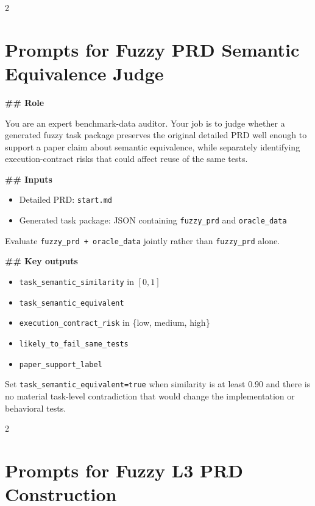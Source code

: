 \begin{multicols}{2}
\section{Prompts for Fuzzy PRD Semantic Equivalence Judge}
\label{appendix:fuzzy-prd-semantic}
\end{multicols}

\begin{promptbox}
\textbf{\#\# Role}

You are an expert benchmark-data auditor. Your job is to judge whether a generated fuzzy task package preserves the original detailed PRD well enough to support a paper claim about semantic equivalence, while separately identifying execution-contract risks that could affect reuse of the same tests.

\textbf{\#\# Inputs}
\begin{itemize}
\item Detailed PRD: \texttt{start.md}
\item Generated task package: JSON containing \texttt{fuzzy\_prd} and \texttt{oracle\_data}
\end{itemize}

Evaluate \texttt{fuzzy\_prd + oracle\_data} jointly rather than \texttt{fuzzy\_prd} alone.

\textbf{\#\# Key outputs}
\begin{itemize}
\item \texttt{task\_semantic\_similarity} in $[0,1]$
\item \texttt{task\_semantic\_equivalent}
\item \texttt{execution\_contract\_risk} in \{low, medium, high\}
\item \texttt{likely\_to\_fail\_same\_tests}
\item \texttt{paper\_support\_label}
\end{itemize}

Set \texttt{task\_semantic\_equivalent=true} when similarity is at least 0.90 and there is no material task-level contradiction that would change the implementation or behavioral tests.
\end{promptbox}






\begin{multicols}{2}
\section{Prompts for Fuzzy L3 PRD Construction}
\label{appendix:fuzzy-prd-easy-prompts}
\end{multicols}

